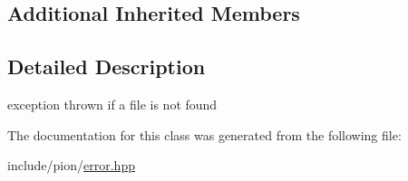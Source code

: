 \subsection*{Additional Inherited Members}


\subsection{Detailed Description}
exception thrown if a file is not found 

The documentation for this class was generated from the following file\-:\begin{DoxyCompactItemize}
\item 
include/pion/\hyperlink{error_8hpp}{error.\-hpp}\end{DoxyCompactItemize}
